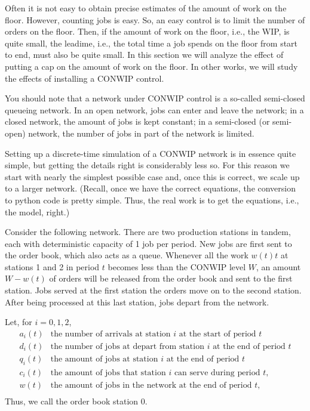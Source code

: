 \documentclass{scrartcl}
\begin{document}
Often it is not easy to obtain precise estimates of the amount of work on the floor.
However, counting jobs is easy.
So, an easy control is to limit the number of orders on the floor.
Then, if the amount of work on the floor, i.e., the WIP, is quite small, the leadime, i.e., the total time a job spends on the floor from start to end, must also be quite small.
In this section we will analyze the effect of putting a cap on the amount of work on the floor.
In other works, we will study the effects of installing a CONWIP control.

You should note that a network under CONWIP control is a so-called semi-closed queueing network.
In an open network, jobs can enter and leave the network; in a closed network, the amount of jobs is kept constant; in a semi-closed (or semi-open) network, the number of jobs in part of the network is limited.

Setting up a discrete-time simulation of a CONWIP network is in essence quite simple, but getting the details right is considerably less so.
For this reason we start with nearly the simplest possible case and, once this is correct, we scale up to a larger network.
(Recall, once we have the correct equations, the conversion to python code is pretty simple.
Thus, the real work is to get the equations, i.e., the model, right.)

Consider the following network.
There are two production stations in tandem, each with deterministic capacity of 1 job per period.
New jobs are first sent to the order book, which also acts as a queue.
Whenever all the work $w(t)t$ at stations 1 and 2 in period $t$ becomes less than the CONWIP level $W$, an amount $W-w(t)$ of orders will be released from the order book and sent to the first station.
Jobs served at the first station the orders move on to the second station.
After being processed at this last station, jobs depart from the network.


Let, for $i=0, 1, 2$, 
\begin{align*}
a_i(t) & \text{the number of arrivals at station $i$  at the start of period $t$} \\
d_i(t) & \text{the number of jobs at depart from station $i$  at the end of period $t$} \\
q_i(t) & \text{the amount of jobs at station $i$  at the end of period $t$} \\
c_i(t) & \text{the amount of jobs that station $i$  can serve during  period $t$}, \\
w(t) & \text{the amount of jobs in the network at the end of period $t$}, \\
\end{align*}
Thus, we call the order book station $0$. 
\end{document}
